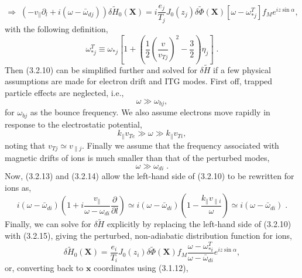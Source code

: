 \documentclass[12pt]{article}
\numberwithin{equation}{subsection}
\begin{document}
   \begin{equation}
      \Rightarrow\; (-v_\parallel\partial_l + i(\omega - \bar{\omega}_{dj}))\delta\widetilde{H}_0(\bm{X})
      = i\frac{e_j}{T_j}J_0(z_j)\delta\widetilde{\Phi}(\bm{X})[\omega - \omega_{*j}^T]f_Me^{iz\sin\alpha},
   \end{equation}
with the following definition,
   \begin{equation}
      \omega_{*j}^T \equiv \omega_{*j}[1 + (\frac{1}{2}\left(\frac{v}{v_{Tj}}\right)^2-\frac{3}{2})\eta_j]\;.
   \end{equation}
Then (3.2.10) can be simplified further and solved for $\delta\widetilde{H}$ if a few physical assumptions are made for electron drift and ITG modes.
First off, trapped particle effects are neglected, i.e.,
   \begin{equation}
      \omega \gg \omega_{bj},
   \end{equation}
for $\omega_{bj}$ as the bounce frequency. We also assume electrons move rapidly in response to the electrostatic potential,
   \begin{equation}
      k_\parallel v_{Te} \gg \omega \gg k_\parallel v_{Ti},
   \end{equation}
noting that $v_{Tj} \simeq v_{\parallel j}$. Finally we assume that the frequency associated with magnetic drifts of ions is much smaller than
that of the perturbed modes,
   \begin{equation}
      \omega \gg \omega_{di}\;.
   \end{equation}
Now, (3.2.13) and (3.2.14) allow the left-hand side of (3.2.10) to be rewritten for ions as,
   \begin{equation}
      i(\omega-\bar{\omega}_{di})(1+i\frac{v_\parallel}{\omega-\omega_{di}}\frac{\partial}{\partial l}) \simeq
      i(\omega-\bar{\omega}_{di})(1-\frac{k_\parallel v_{\parallel i}}{\omega}) \simeq i(\omega-\bar{\omega}_{di})\;.
   \end{equation}
Finally, we can solve for $\delta\widetilde{H}$ explicitly by replacing the left-hand side of (3.2.10) with (3.2.15), giving
the perturbed, non-adiabatic distribution function for ions,
   \begin{equation}
      \delta\widetilde{H}_0(\bm{X}) = \frac{e_i}{T_i}J_0(z_i)\delta\widetilde{\Phi}(\bm{X})
                                      f_M\frac{\omega-\omega_{*i}^T}{\omega-\bar{\omega}_{di}}e^{iz\sin\alpha},
   \end{equation}
or, converting back to $\bm{x}$ coordinates using (3.1.12),
   
\end{document}
